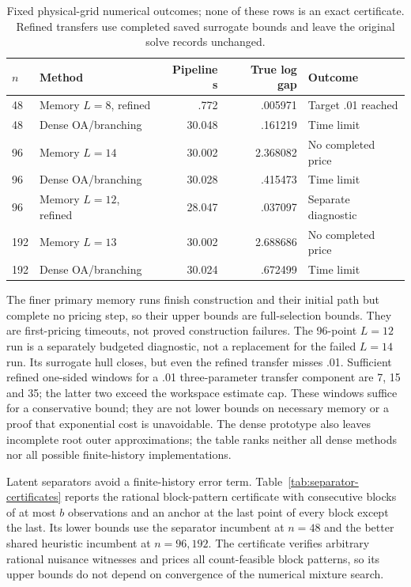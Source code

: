 \begin{table}[htbp]
\centering\small
\caption{Fixed physical-grid numerical outcomes; none of these rows is an
exact certificate. Refined transfers use completed saved surrogate bounds and
leave the original solve records unchanged.}
\label{tab:physical-grid}
\begin{tabular}{llrrl}
\toprule
$n$ & Method & Pipeline s & True log gap & Outcome\\
\midrule
48 & Memory $L=8$, refined & .772 & .005971 & Target .01 reached\\
48 & Dense OA/branching & 30.048 & .161219 & Time limit\\
96 & Memory $L=14$ & 30.002 & 2.368082 & No completed price\\
96 & Dense OA/branching & 30.028 & .415473 & Time limit\\
96 & Memory $L=12$, refined & 28.047 & .037097 & Separate diagnostic\\
192 & Memory $L=13$ & 30.002 & 2.688686 & No completed price\\
192 & Dense OA/branching & 30.024 & .672499 & Time limit\\
\bottomrule
\end{tabular}
\end{table}

The finer primary memory runs finish construction and their initial path but
complete no pricing step, so their upper bounds are full-selection bounds.
They are first-pricing timeouts, not proved construction failures.
The 96-point $L=12$ run is a separately budgeted diagnostic, not a replacement
for the failed $L=14$ run. Its surrogate hull closes, but even the refined
transfer misses .01. Sufficient refined one-sided windows for a .01
three-parameter transfer component are 7, 15 and 35; the latter two exceed the
workspace estimate cap. These windows suffice for a conservative bound; they
are not lower bounds on necessary memory or a proof that exponential cost is
unavoidable. The dense prototype also leaves incomplete root outer
approximations; the table ranks neither all dense methods nor all possible
finite-history implementations.

Latent separators avoid a finite-history error term.
Table~\ref{tab:separator-certificates} reports the rational block-pattern
certificate with consecutive blocks of at most $b$ observations and an anchor
at the last point of every block except the last. Its lower bounds use the
separator incumbent at $n=48$ and the better shared heuristic incumbent at
$n=96,192$. The certificate verifies arbitrary rational nuisance witnesses
and prices all count-feasible block patterns, so its upper bounds do not
depend on convergence of the numerical mixture search.

